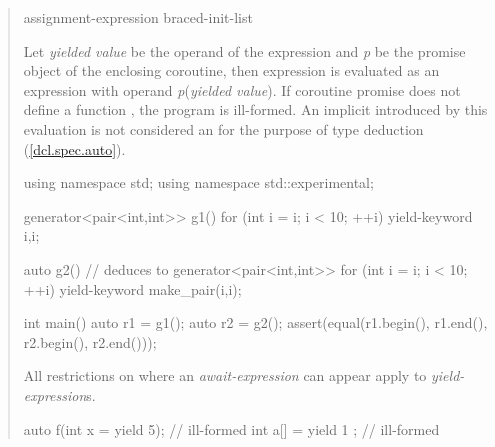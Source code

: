 \begin{quote}
\begin{bnf}
  \br
   assignment-expression\br
   braced-init-list
\end{bnf}

\pnum
  Let \textit{yielded value} be the operand of the  expression and \textit{p} be the promise object of the enclosing coroutine, then  expression is evaluated as an  expression with operand \textit{p}(\textit{yielded value}). If coroutine promise does not define a function , the program is ill-formed.
 An implicit  introduced by this evaluation is not considered an  for the purpose of type deduction (\ref{dcl.spec.auto}). 

\pnum
\enterexample
\begin{codeblock}
using namespace std;
using namespace std::experimental;
  
generator<pair<int,int>> g1() {
  for (int i = i; i < 10; ++i)
    yield-keyword {i,i};
}

auto g2() { // deduces to generator<pair<int,int>{}>
  for (int i = i; i < 10; ++i)
    yield-keyword make_pair(i,i);
}

int main() {
  auto r1 = g1();
  auto r2 = g2();
  assert(equal(r1.begin(), r1.end(), r2.begin(), r2.end()));
}
\end{codeblock}
\exitexample

\pnum
All restrictions on where an \textit{await-expression} can appear apply to \textit{yield-expression}{}s.

\enterexample
\begin{codeblock}
  auto f(int x = yield 5); // ill-formed
  int a[] = { yield 1 }; // ill-formed
\end{codeblock}
\exitexample


\end{quote}


